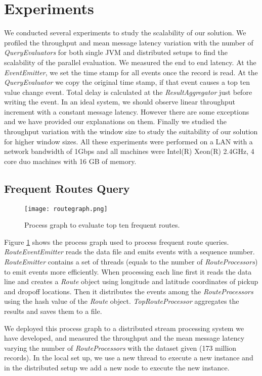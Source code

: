 \section{Experiments}
We conducted several experiments to study the scalability of our solution. We profiled the throughput and mean message latency variation with the number of \textit{QueryEvaluators} for both single JVM and distributed setups to find the scalability of the parallel evaluation. We measured the end to end latency. At the \textit{EventEmitter}, we set the time stamp for all events once the record is read. At the \textit{QueryEvaluator} we copy the original time stamp, if that event causes a top ten value change event. Total delay is calculated at the \textit{ResultAggregator} just before writing the event. In an ideal system, we should observe linear throughput increment with a constant message latency. However there are some exceptions and we have provided our explanations on them. Finally we studied the throughput variation with the window size to study the suitability of our solution for higher window sizes. All these experiments were performed on a LAN with a network bandwidth of 1Gbps and all machines were Intel(R) Xeon(R) 2.4GHz, 4 core duo machines with 16 GB of memory. 

\subsection{Frequent Routes Query}

\begin{figure}[!t]
        \centering
        \texttt{[image: routegraph.png]}
        \caption{Process graph to evaluate top ten frequent routes.}
        \label{routegraph}
\end{figure}

Figure \ref{routegraph} shows the process graph used to process frequent route queries. \textit{RouteEventEmitter} reads the data file and emits events with a sequence number. \textit{RouteEmitter} contains a set of threads (equals to the number of \textit{RouteProcessors}) to emit events more efficiently. When processing each line first it reads the data line and creates a \textit{Route} object using longitude and latitude coordinates of pickup and dropoff locations. Then it distributes the events among the \textit{RouteProcessors} using the hash value of the \textit{Route} object. \textit{TopRouteProcessor} aggregates the results and saves them to a file.

We deployed this process graph to a distributed stream processing system we have developed, and  measured the throughput and the mean message latency varying the number of \textit{RouteProcessors} with the dataset given (173 million records). In the local set up, we use a new thread to execute a new instance and in the distributed setup we add a new node to execute the new instance.

